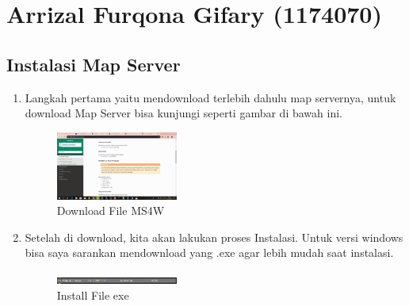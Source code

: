 \section{Arrizal Furqona Gifary (1174070)}
\subsection{Instalasi Map Server}
\begin{enumerate}
    \item Langkah pertama yaitu mendownload terlebih dahulu map servernya, untuk download Map Server bisa kunjungi seperti gambar di bawah ini.
  \hfill\break
  \begin{figure}[H]
  \includegraphics[width=4cm]{figures/tugas4/1174070/1.png}
  \centering
  \caption{Download File MS4W}
  \end{figure}
    
   

    \item Setelah di download, kita akan lakukan proses Instalasi. Untuk versi windows bisa saya sarankan mendownload yang .exe agar lebih mudah saat instalasi.
   
    
  \hfill\break
  \begin{figure}[H]
  \includegraphics[width=4cm]{figures/tugas4/1174070/2.png}
  \centering
  \caption{Install File exe}
  \end{figure}
    
    

\end{enumerate}


